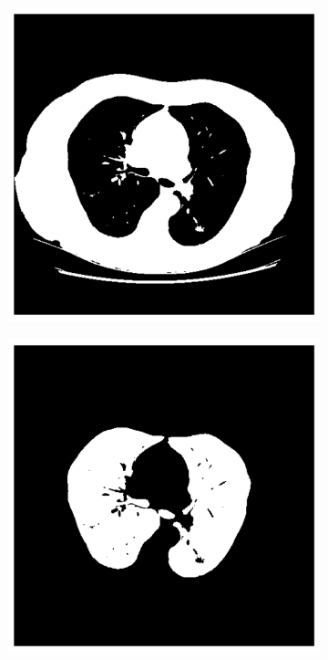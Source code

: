 \documentclass[11pt]{article}
\begin{document}
\begin{figure}[H]
    \centering
    \begin{subfigure}{.3\textwidth}
        \centering
        \includegraphics[width=\linewidth]{figs/q1a_binary.png}  %
        \caption{}
        \label{fig:otsu_threshold}
    \end{subfigure}%
    \begin{subfigure}{.3\textwidth}
        \centering
        \includegraphics[width=\linewidth]{figs/q1a_largest_connected_components.png}  %

\end{subfigure}
\end{figure}
\end{document}

